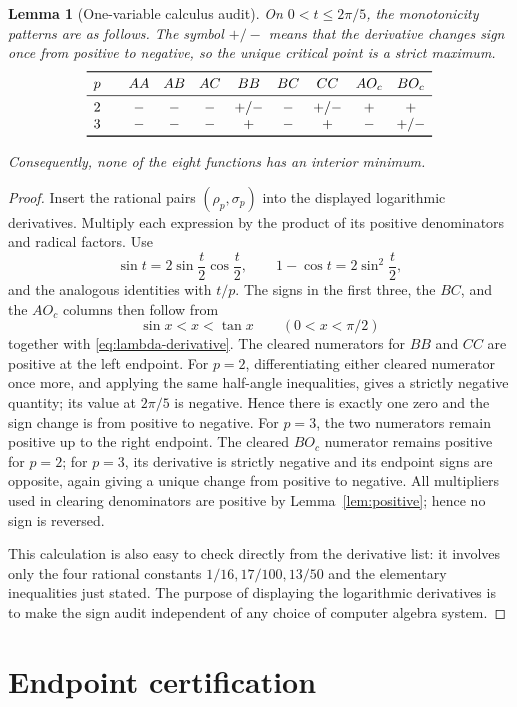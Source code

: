 \documentclass{amsart}
\newtheorem{lemma}{Lemma}
\newcommand{\tablegap}{\par\vspace{0.2cm}}
\begin{document}
\begin{lemma}[One-variable calculus audit]\label{lem:calculus}
On \(0<t\leq2\pi/5\), the monotonicity patterns are as follows.  The
symbol \(+/-\) means that the derivative changes sign once from positive
to negative, so the unique critical point is a strict maximum.
\begingroup
\small
\[
\begin{array}{c@{\qquad}cccccccc}
\toprule
p&AA&AB&AC&BB&BC&CC&AO_c&BO_c\\
\midrule
2&-&-&-&+/-&-&+/-&+&+\\
3&-&-&-&+&-&+&-&+/-\\
\bottomrule
\end{array}
\]
\endgroup
\tablegap
Consequently, none of the eight functions has an interior minimum.
\end{lemma}

\begin{proof}
Insert the rational pairs \((\rho_p,\sigma_p)\) into the displayed
logarithmic derivatives.  Multiply each expression by the product of its
positive denominators and radical factors.  Use
\[
 \sin t=2\sin\frac t2\cos\frac t2,
 \qquad 1-\cos t=2\sin^2\frac t2,
\]
and the analogous identities with \(t/p\).  The signs in the first three,
the \(BC\), and the \(AO_c\) columns then follow from
\[
 \sin x<x<\tan x\qquad (0<x<\pi/2)
\]
together with \eqref{eq:lambda-derivative}.  The cleared numerators for
\(BB\) and \(CC\) are positive at the left endpoint.  For \(p=2\),
differentiating either cleared numerator once more, and applying the same
half-angle inequalities, gives a strictly negative quantity; its value at
\(2\pi/5\) is negative.  Hence there is exactly one zero and the sign
change is from positive to negative.  For \(p=3\), the two numerators
remain positive up to the right endpoint.  The cleared \(BO_c\) numerator
remains positive for \(p=2\); for \(p=3\), its derivative is strictly
negative and its endpoint signs are opposite, again giving a unique change
from positive to negative.  All multipliers used in clearing denominators
are positive by Lemma~\ref{lem:positive}; hence no sign is reversed.

This calculation is also easy to check directly from the derivative list:
it involves only the four rational constants
\(1/16,17/100,13/50\) and the elementary inequalities just stated.  The
purpose of displaying the logarithmic derivatives is to make the sign
audit independent of any choice of computer algebra system.
\end{proof}

\section{Endpoint certification}
\end{document}

